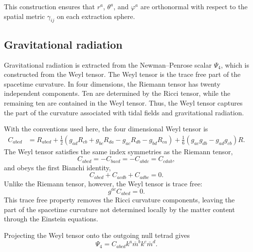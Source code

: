 This construction ensures that $r^a$, $\theta^a$, and $\varphi^a$ are orthonormal with respect to the spatial metric $\gamma_{ij}$ on each extraction sphere.

\subsection{Gravitational radiation}

Gravitational radiation is extracted from the Newman--Penrose scalar $\Psi_4$, which is constructed from the Weyl tensor. The Weyl tensor is the trace free part of the spacetime curvature. In four dimensions, the Riemann tensor has twenty independent components. Ten are determined by the Ricci tensor, while the remaining ten are contained in the Weyl tensor. Thus, the Weyl tensor captures the part of the curvature associated with tidal fields and gravitational radiation.

With the conventions used here, the four dimensional Weyl tensor is
\begin{equation}
\begin{aligned}
C_{abcd}
&=
R_{abcd}
+
\frac{1}{2}
\left(
g_{ad} R_{cb}
+
g_{bc} R_{da}
-
g_{ac} R_{db}
-
g_{bd} R_{ca}
\right)
+
\frac{1}{6}
\left(
g_{ac}g_{db}
-
g_{ad}g_{cb}
\right)R .
\end{aligned}
\label{eq:app_waveex_weyl_4d}
\end{equation}
The Weyl tensor satisfies the same index symmetries as the Riemann tensor,
\begin{equation}
C_{abcd}
=
-C_{bacd}
=
-C_{abdc}
=
C_{cdab},
\end{equation}
and obeys the first Bianchi identity,
\begin{equation}
C_{abcd}
+
C_{acdb}
+
C_{adbc}
=
0 .
\end{equation}
Unlike the Riemann tensor, however, the Weyl tensor is trace free:
\begin{equation}
g^{ac}C_{abcd}=0.
\end{equation}
This trace free property removes the Ricci curvature components, leaving the part of the spacetime curvature not determined locally by the matter content through the Einstein equations.

Projecting the Weyl tensor onto the outgoing null tetrad gives
\begin{equation}
\Psi_4
=
C_{abcd} k^a \bar{m}^b k^c \bar{m}^d .
\label{eq:app_waveex_psi4_def}
\end{equation}

